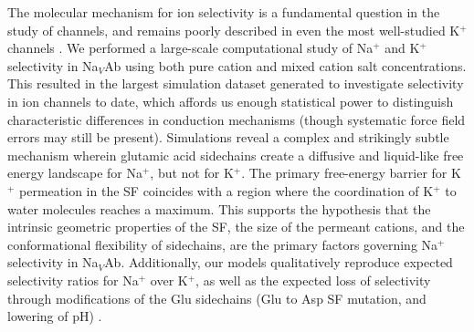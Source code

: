 \begin{refsection}

The molecular mechanism for ion selectivity is a fundamental question in the study of channels, and remains poorly described in even the most well-studied K$^+$ channels \cite{Andersen:2011ty}. We performed a large-scale computational study of Na$^+$ and K$^+$ selectivity in Na$_V$Ab using both pure cation and mixed cation salt concentrations. This resulted in the largest simulation dataset generated to investigate selectivity in ion channels to date, which affords us enough statistical power to distinguish characteristic differences in conduction mechanisms (though systematic force field errors may still be present). Simulations reveal a complex and strikingly subtle mechanism wherein glutamic acid sidechains create a diffusive and liquid-like free energy landscape for Na$^+$, but not for K$^+$. The primary free-energy barrier for K$^+$ permeation in the SF coincides with a region where the coordination of K$^+$ to water molecules reaches a maximum. This supports the hypothesis that the intrinsic geometric properties of the SF, the size of the permeant cations, and the conformational flexibility of sidechains, are the primary factors governing Na$^+$ selectivity in Na$_V$Ab. Additionally, our models qualitatively reproduce expected selectivity ratios for Na$^+$ over K$^+$, as well as the expected loss of selectivity through modifications of the Glu sidechains (Glu to Asp SF mutation, and lowering of pH) \cite{FinolUrdaneta:2014bz}. %


\end{refsection}
